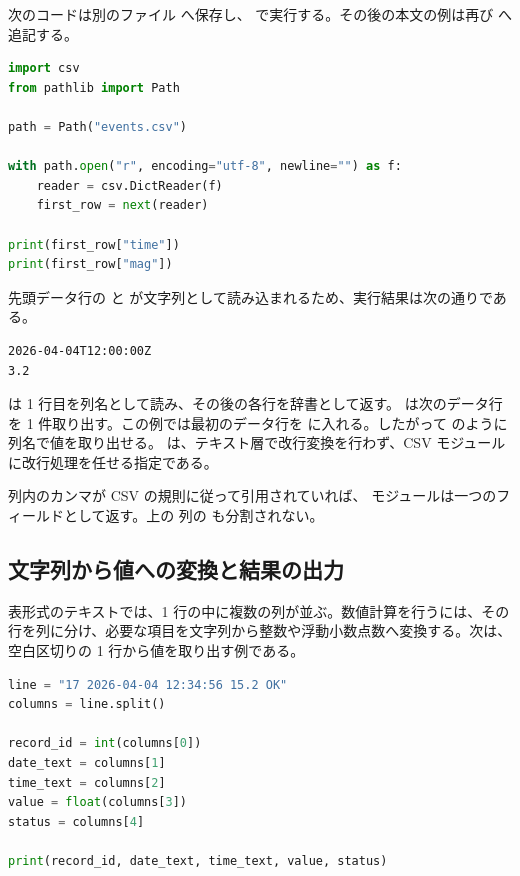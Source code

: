 次のコードは別のファイル  へ保存し、 で実行する。その後の本文の例は再び  へ追記する。

\begin{lstlisting}[language=Python]
import csv
from pathlib import Path

path = Path("events.csv")

with path.open("r", encoding="utf-8", newline="") as f:
    reader = csv.DictReader(f)
    first_row = next(reader)

print(first_row["time"])
print(first_row["mag"])
\end{lstlisting}

先頭データ行の  と  が文字列として読み込まれるため、実行結果は次の通りである。

\begin{lstlisting}[numbers=none, xleftmargin=2\zw]
2026-04-04T12:00:00Z
3.2
\end{lstlisting}

 は 1 行目を列名として読み、その後の各行を辞書として返す。 は次のデータ行を 1 件取り出す。この例では最初のデータ行を  に入れる。したがって  のように列名で値を取り出せる。 は、テキスト層で改行変換を行わず、CSV モジュールに改行処理を任せる指定である。

列内のカンマが CSV の規則に従って引用されていれば、 モジュールは一つのフィールドとして返す。上の  列の  も分割されない。

\subsection{文字列から値への変換と結果の出力}

表形式のテキストでは、1 行の中に複数の列が並ぶ。数値計算を行うには、その行を列に分け、必要な項目を文字列から整数や浮動小数点数へ変換する。次は、空白区切りの 1 行から値を取り出す例である。

\begin{lstlisting}[language=Python]
line = "17 2026-04-04 12:34:56 15.2 OK"
columns = line.split()

record_id = int(columns[0])
date_text = columns[1]
time_text = columns[2]
value = float(columns[3])
status = columns[4]

print(record_id, date_text, time_text, value, status)
\end{lstlisting}

